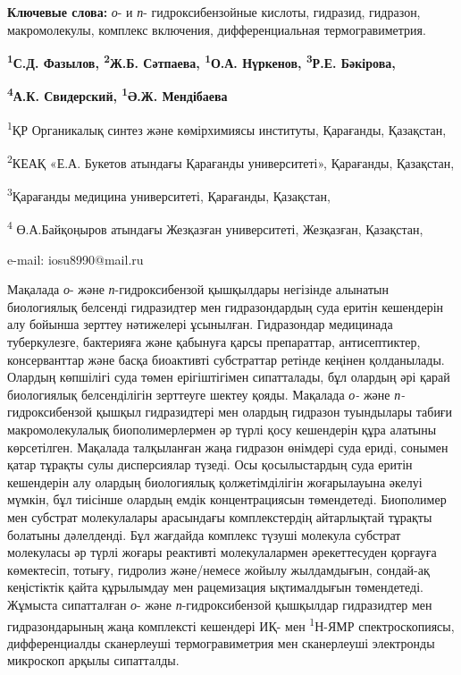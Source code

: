 {\bfseries Ключевые слова:} \emph{о}- и \emph{п}- гидроксибензойные
кислоты, гидразид, гидразон, макромолекулы, комплекс включения,
дифференциальная термогравиметрия.


\begin{center}
{\bfseries \textsuperscript{1}С.Д. Фазылов, \textsuperscript{2}Ж.Б.
Сәтпаева, \textsuperscript{1}О.А. Нүркенов, \textsuperscript{3}Р.Е.
Бәкірова,}

{\bfseries \textsuperscript{4}А.К. Свидерский, \textsuperscript{1}Ә.Ж.
Мендібаева}

\textsuperscript{1}ҚР Органикалық синтез және көмірхимиясы институты,
Қарағанды, Қазақстан,

\textsuperscript{2}КЕАҚ «Е.А. Букетов атындағы Қарағанды университеті»,
Қарағанды, Қазақстан,

\textsuperscript{3}Қарағанды медицина университеті, Қарағанды,
Қазақстан,

\textsuperscript{4} Ө.А.Байқоңыров атындағы Жезқазған университеті,
Жезқазған, Қазақстан,

e-mail: iosu8990@mail.ru
\end{center}

Мақалада \emph{о}- және \emph{п}-гидроксибензой қышқылдары негізінде
алынатын биологиялық белсенді гидразидтер мен гидразондардың суда еритін
кешендерін алу бойынша зерттеу нәтижелері ұсынылған. Гидразондар
медицинада туберкулезге, бактерияға және қабынуға қарсы препараттар,
антисептиктер, консерванттар және басқа биоактивті субстраттар ретінде
кеңінен қолданылады. Олардың көпшілігі суда төмен ерігіштігімен
сипатталады, бұл олардың әрі қарай биологиялық белсенділігін зерттеуге
шектеу қояды. Мақалада \emph{о-} және \emph{п-}гидроксибензой қышқыл
гидразидтері мен олардың гидразон туындылары табиғи макромолекулалық
биополимерлермен әр түрлі қосу кешендерін құра алатыны көрсетілген.
Мақалада талқыланған жаңа гидразон өнімдері суда ериді, сонымен қатар
тұрақты сулы дисперсиялар түзеді. Осы қосылыстардың суда еритін
кешендерін алу олардың биологиялық қолжетімділігін жоғарылауына әкелуі
мүмкін, бұл тиісінше олардың емдік концентрациясын төмендетеді.
Биополимер мен субстрат молекулалары арасындағы комплекстердің
айтарлықтай тұрақты болатыны дәлелденді. Бұл жағдайда комплекс түзуші
молекула субстрат молекуласы әр түрлі жоғары реактивті молекулалармен
әрекеттесуден қорғауға көмектесіп, тотығу, гидролиз және/немесе жойылу
жылдамдығын, сондай-ақ кеңістіктік қайта құрылымдау мен рацемизация
ықтималдығын төмендетеді. Жұмыста сипатталған \emph{о}- және
\emph{п}-гидроксибензой қышқылдар гидразидтер мен гидразондарының жаңа
комплексті кешендері ИҚ- мен \textsuperscript{1}Н-ЯМР спектроскопиясы,
дифференциалды сканерлеуші термогравиметрия мен сканерлеуші электронды
микроскоп арқылы сипатталды.

